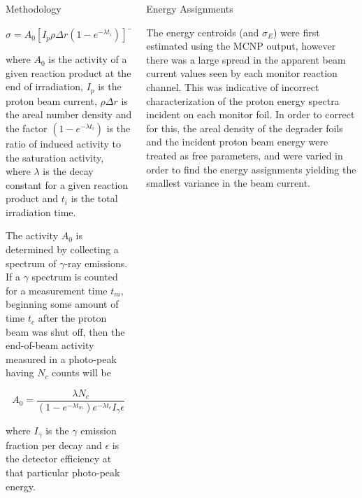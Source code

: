 \documentclass[final]{beamer}
\newlength{\onecolwid}
\newlength{\twocolwid}
\begin{document}
\begin{frame}[t]
\begin{columns}[t]
\begin{column}{\twocolwid}
\begin{columns}[t,totalwidth=\twocolwid]
\begin{column}{\onecolwid}
\begin{block}{Methodology}
{\begin{equation}
\sigma =  A_0[I_p \rho \Delta r (1-e^{-\lambda t_i})]^{-1}
\label{eq:xs_calc}
\end{equation}

where $A_0$ is the activity of a given reaction product at the end of irradiation, $I_p$ is the proton beam current, $\rho \Delta r$ is the areal number density and the factor $(1-e^{-\lambda t_i})$ is the ratio of induced activity to the saturation activity, where $\lambda$ is the decay constant for a given reaction product and $t_i$ is the total irradiation time. 

\hspace*{50pt}The activity $A_0$ is determined by collecting a spectrum of $\gamma$-ray emissions. If a $\gamma$ spectrum is counted for a measurement time $t_m$, beginning some amount of time $t_c$ after the proton beam was shut off, then the end-of-beam activity measured in a photo-peak having $N_c$ counts will be

\begin{equation}
A_0 = \frac{\lambda N_c}{(1-e^{-\lambda t_m})e^{-\lambda t_c}I_{\gamma}\epsilon}
\label{eq:activity}
\end{equation}

where $I_{\gamma}$ is the $\gamma$ emission fraction per decay and $\epsilon$ is the detector efficiency at that particular photo-peak energy.
}

\end{block}
\end{column} %
\begin{column}{\onecolwid} %
\begin{block}{Energy Assignments}

\small{\hspace*{50pt}The energy centroids (and $\sigma_E$) were first estimated using the MCNP output, however there was a large spread in the apparent beam current values seen by each monitor reaction channel.  This was indicative of incorrect characterization of the proton energy spectra incident on each monitor foil.  In order to correct for this, the areal density of the degrader foils and the incident proton beam energy were treated as free parameters, and were varied in order to find the energy assignments yielding the smallest variance in the beam current.}


\end{block}
\end{column}
\end{columns}
\end{column}
\end{columns}
\end{frame}
\end{document}
